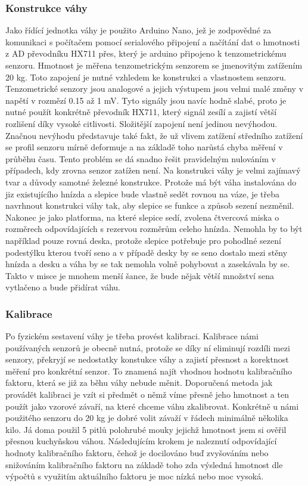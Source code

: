 \subsubsection{Konstrukce váhy}
Jako řídící jednotka váhy je použito Arduino Nano, jež je zodpovědné za komunikaci s počítačem pomocí serialového připojení a načítání dat o hmotnosti z AD převodníku HX711 přes, který je arduino připojeno k tenzometrickému senzoru.
Hmotnost je měřena tenzometrickým senzorem se jmenovitým zatížením 20 kg.
Toto zapojení je nutné vzhledem ke konstrukci a vlastnostem senzoru.
Tenzometrické senzory jsou analogové a jejich výstupem jsou velmi malé změny v napětí v rozmězí 0.15 až 1 mV.
Tyto signály jsou navíc hodně slabé, proto je nutné použít konkrétně převodník HX711, který signál zesílí a zajistí větší rozlišení díky vysoké citlivosti.
Složitější zapojení není jedinou nevýhodou.
Značnou nevýhodu představuje také fakt, že už vlivem zatížení středního zatížení se profil senzoru mírně deformuje a na základě toho narůstá chyba měření v průběhu času.
Tento problém se dá snadno řešit pravidelným nulováním v případech, kdy zrovna senzor zatížen není.
Na konstrukci váhy je velmi zajímavý tvar a důvody samotné železné konstrukce.
Protože má být váha instalována do jiz existujícího hnízda a slepice bude vlastně sedět rovnou na váze, je třeba navrhnout konstrukci váhy tak, aby slepice se funkce a způsob sezení nezměnil.
Nakonec je jako platforma, na které slepice sedí, zvolena čtvercová miska o rozměrech odpovídajících s rezervou rozměrům celeho hnízda.
Nemohla by to být například pouze rovná deska, protože slepice potřebuje pro pohodlné sezení podestýlku kterou tvoří seno a v případě desky by se seno dostalo mezi stěny hnízda a desku a váha by se tak nemohla volně pohybovat a zasekávala by se.
Takto v misce je mnohem menší šance, že bude nějak větší množství sena vytlačeno a bude přidírat váhu.

\subsubsection{Kalibrace}
Po fyzickém sestavení váhy je třeba provést kalibraci.
Kalibrace námi používaných senzorů je obecně nutná, protože se díky ní eliminují rozdíli mezi senzory, překryjí se nedostatky konstukce váhy a zajistí přesnost a korektnost měření pro konkrétní senzor.
To znamená najít vhodnou hodnotu kalibračního faktoru, která se již za běhu váhy nebude měnit.
Doporučená metoda jak provádět kalibraci je vzít si předmět o němž víme přesně jeho hmotnost a ten použít jako vzorové závaří, na které chceme váhu zkalibrovat.
Konkrétně u námi použitého senzoru do 20 kg je dobré volit závaží v řádech minimálně několika kilo.
Já doma použil 5 pitlů polohrubé mouky jejichž hmotnost jsem si ověřil přesnou kuchyňskou váhou.
Následujícím krokem je naleznutí odpovídající hodnoty kalibračního faktoru, čehož je docilováno buď zvyšováním nebo snižováním kalibračního faktoru na základě toho zda výsledná hmotnost dle výpočtů s využitím aktuálního faktoru je moc nízká nebo moc vysoká.



